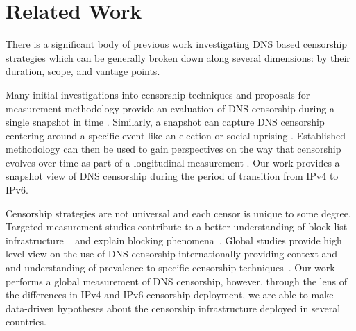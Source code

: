 \section{Related Work}\label{sec:related}
% 
There is a significant body of previous work investigating DNS based censorship
strategies which can be generally broken down along several dimensions: by their
duration, scope, and vantage points.

Many initial investigations into censorship techniques and
proposals for measurement methodology provide an evaluation of DNS censorship
during a single snapshot in time \cite{Anonymous2020:TripletCensors,
global2002great, vandersloot2018quack, scott2016satellite, pearce2017global}. 
Similarly, a snapshot can capture DNS censorship centering around a specific
event like an election or social uprising \cite{aryan2013internet}.  Established
methodology can then be used to gain perspectives on the way that censorship
evolves over time as part of  a longitudinal measurement
\cite{USESEC21:GFWatch, filasto2012ooni, sundara2020censored, niaki2020iclab,
razaghpanah2016exploring}. Our work provides a snapshot view of DNS censorship
during the period of transition from IPv4 to IPv6.

Censorship strategies are not universal and each censor is unique to some
degree. Targeted measurement studies contribute to a better understanding of
block-list infrastructure ~\cite{ramesh2020decentralized, USESEC21:GFWatch} and
explain blocking phenomena~\cite{global2002great,
Anonymous2020:TripletCensors}. Global studies provide high level view on the
use of DNS censorship internationally providing context and and understanding
of prevalence to specific censorship techniques~\cite{vandersloot2018quack,
scott2016satellite, pearce2017global, sundara2020censored, niaki2020iclab}.
Our work performs a global measurement of DNS censorship, however, through the
lens of the differences in IPv4 and IPv6 censorship deployment, we are able to
make data-driven hypotheses about the censorship infrastructure deployed in
several countries.

